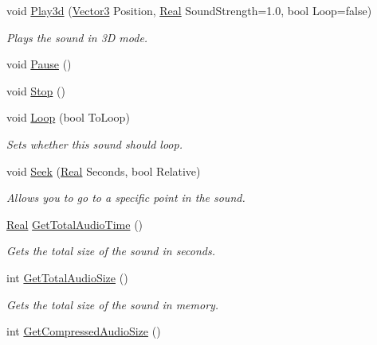 \begin{DoxyCompactItemize}
void \hyperlink{classphys_1_1Sound_adbb79c9d1a37bf541bfb259551c6067f}{Play3d} (\hyperlink{classphys_1_1Vector3}{Vector3} Position, \hyperlink{namespacephys_af7eb897198d265b8e868f45240230d5f}{Real} SoundStrength=1.0, bool Loop=false)
\begin{DoxyCompactList}\small\item\em Plays the sound in 3D mode. \item\end{DoxyCompactList}\item 
void \hyperlink{classphys_1_1Sound_a805bef416bec70b5e250dd29e622cf46}{Pause} ()
\item 
void \hyperlink{classphys_1_1Sound_a662d760ec0e6214537b13810a8ac9955}{Stop} ()
\item 
void \hyperlink{classphys_1_1Sound_afd5645195ac744de62c5eefc01dbf0d0}{Loop} (bool ToLoop)
\begin{DoxyCompactList}\small\item\em Sets whether this sound should loop. \item\end{DoxyCompactList}\item 
void \hyperlink{classphys_1_1Sound_a8dfc3b7e9419a3c50c0ac6ecf6ece096}{Seek} (\hyperlink{namespacephys_af7eb897198d265b8e868f45240230d5f}{Real} Seconds, bool Relative)
\begin{DoxyCompactList}\small\item\em Allows you to go to a specific point in the sound. \item\end{DoxyCompactList}\item 
\hyperlink{namespacephys_af7eb897198d265b8e868f45240230d5f}{Real} \hyperlink{classphys_1_1Sound_a2c3864cbc6c25cd9a47529c75dea142b}{GetTotalAudioTime} ()
\begin{DoxyCompactList}\small\item\em Gets the total size of the sound in seconds. \item\end{DoxyCompactList}\item 
int \hyperlink{classphys_1_1Sound_a2891732590e4276a64583ee9bdab555e}{GetTotalAudioSize} ()
\begin{DoxyCompactList}\small\item\em Gets the total size of the sound in memory. \item\end{DoxyCompactList}\item 
int \hyperlink{classphys_1_1Sound_af568fd5293ecab6185f509e52209a0a2}{GetCompressedAudioSize} ()

\end{DoxyCompactItemize}
